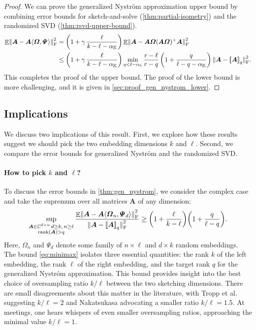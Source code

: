 \documentclass[11pt]{article}
\newcommand{\complex}{\mathbb{C}}
\newcommand{\field}{\mathbb{K}}
\DeclareMathOperator{\rank}{rank}
\newcommand{\mat}[1]{\boldsymbol{#1}}
\newcommand{\lowrank}[1]{%
  \mleft[\!\mleft[ #1 \mright]\!\mright]}
\newcommand{\norm}[1]{\mleft\| #1 \mright\|}
\DeclareMathOperator{\expect}{\mathbb{E}}
\theoremstyle{definition}
\numberwithin{equation}{section}
\begin{document}
\begin{proof}
We can prove the generalized Nystr\"om approximation upper bound by combining error bounds for sketch-and-solve (\cref{thm:partial-isometry}) and the randomized SVD (\cref{thm:rsvd-upper-bound}).
%
\begin{align*}
    \expect \norm{\mat{A} - \mat{A}\langle\mat{\varOmega},\mat{\varPsi}\rangle}_{\rm F}^2 
    &= \left(1 + \gamma \,  \frac{\ell}{k - \ell - \alpha_\field} \right)\expect \norm{\smash{\mat{A} - \mat{A}\mat{\varOmega}(\mat{A}\mat{\varOmega})^+ \mat{A}}}_{\rm F}^2 \\ 
    &\le \left(1 + \gamma\, \frac{\ell}{k - \ell - \alpha_\field} \right) 
    \min_{q < \ell-\alpha_\field} \frac{r-\ell}{r-q} \left( 1 + \frac{q}{\ell-q-\alpha_\field} \right) 
    \norm{\smash{\mat{A} - \lowrank{\mat{A}}_q}}_{\rm F}^2.
\end{align*}
This completes the proof of the upper bound. The proof of the lower bound is more challenging, and it is given in \cref{sec:proof_gen_nystrom_lower}.
\end{proof}

\subsection{Implications}
We discuss two implications of this result.
First, we explore how these results suggest we should pick the two embedding dimensions $k$ and $\ell$.
Second, we compare the error bounds for generalized Nystr\"om and the randomized SVD.

\paragraph{How to pick $k$ and $\ell$?}
To discuss the error bounds in \cref{thm:gen_nystrom}, we consider the complex case and take the supremum over all matrices $\mat{A}$ of any dimension:
\begin{equation}
\label{eq:minimax}
    \sup_{
    \substack{\mat{A} \in \complex^{d \times n} \, d \geq k,\, n \geq \ell\\ \rank(\mat{A}) > q}}
    \frac{\expect \norm{\mat{A} - \mat{A}\langle\mat{\varOmega}_n,\mat{\varPsi}_d\rangle}_{\rm F}^2}{\norm{\smash{\mat{A} - \lowrank{\mat{A}}_q}}_{\rm F}^2}
    \geq \biggl(1 + \frac{\ell}{k-\ell}\biggr)\biggl(1 + \frac{q}{\ell-q}\biggr).
\end{equation}
%
Here, $\mat{\varOmega}_n$ and $\mat{\varPsi}_d$ denote some family of $n\times \ell$ and $d\times k$ random embeddings.
The bound \cref{eq:minimax} isolates three essential quantities: the rank $k$ of the left embedding, the rank $\ell$ of the right embedding, and the target rank $q$ for the generalized Nystr{\'o}m approximation.
This bound provides insight into the best choice of oversampling ratio $k/\ell$ between the two sketching dimensions.
There are small disagreements about this matter in the literature, with Tropp et al.~\cite[pg.~1456]{TYUC17} suggesting $k/\ell = 2$ and Nakatsukasa \cite[Alg.~2.1]{Nak20} advocating a smaller ratio $k/\ell = 1.5$.
At meetings, one hears whispers of even smaller oversampling ratios, approaching the minimal value $k/\ell = 1$.
\end{document}
